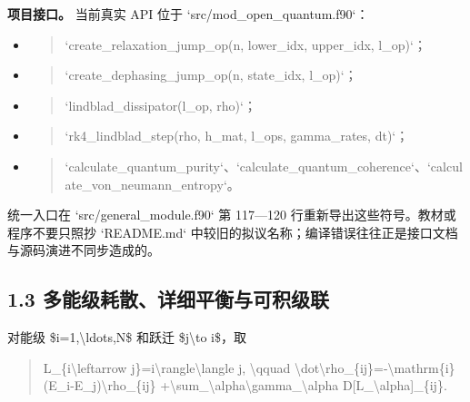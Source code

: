 \documentclass[UTF8,openany,11pt,fontset=fandol]{ctexbook}
\begin{document}
\textbf{项目接口。} 当前真实 API 位于 `src/mod\_open\_quantum.f90`：

\begin{itemize}
\item
  \begin{quote}
  `create\_relaxation\_jump\_op(n, lower\_idx, upper\_idx, l\_op)`；
  \end{quote}
\item
  \begin{quote}
  `create\_dephasing\_jump\_op(n, state\_idx, l\_op)`；
  \end{quote}
\item
  \begin{quote}
  `lindblad\_dissipator(l\_op, rho)`；
  \end{quote}
\item
  \begin{quote}
  `rk4\_lindblad\_step(rho, h\_mat, l\_ops, gamma\_rates, dt)`；
  \end{quote}
\item
  \begin{quote}
  `calculate\_quantum\_purity`、`calculate\_quantum\_coherence`、`calculate\_von\_neumann\_entropy`。
  \end{quote}
\end{itemize}

统一入口在 `src/general\_module.f90` 第 117---120
行重新导出这些符号。教材或程序不要只照抄 `README.md`
中较旧的拟议名称；编译错误往往正是接口文档与源码演进不同步造成的。

\subsection{\texorpdfstring{\textbf{1.3
多能级耗散、详细平衡与可积级联}}{1.3 多能级耗散、详细平衡与可积级联}}\label{ux591aux80fdux7ea7ux8017ux6563ux8be6ux7ec6ux5e73ux8861ux4e0eux53efux79efux7ea7ux8054}

对能级 \$i=1,\textbackslash ldots,N\$ 和跃迁 \$j\textbackslash to
i\$，取

\begin{quote}
L\_\{i\textbackslash leftarrow
j\}=\textbar i\textbackslash rangle\textbackslash langle j\textbar,
\textbackslash qquad
\textbackslash dot\textbackslash rho\_\{ij\}=-\textbackslash mathrm\{i\}(E\_i-E\_j)\textbackslash rho\_\{ij\}
+\textbackslash sum\_\textbackslash alpha\textbackslash gamma\_\textbackslash alpha
D{[}L\_\textbackslash alpha{]}\_\{ij\}.
\end{quote}
\end{document}
